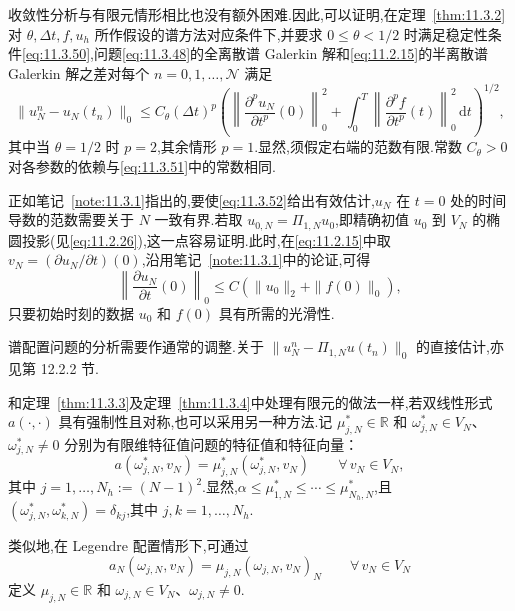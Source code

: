 收敛性分析与有限元情形相比也没有额外困难.因此,可以证明,在定理~\ref{thm:11.3.2}对 \(\theta,\Delta t,f,u_h\) 所作假设的谱方法对应条件下,并要求 \(0\le\theta<1/2\) 时满足稳定性条件\eqref{eq:11.3.50},问题\eqref{eq:11.3.48}的全离散谱 Galerkin 解和\eqref{eq:11.2.15}的半离散谱 Galerkin 解之差对每个 \(n=0,1,\ldots,\mathcal N\) 满足
\begin{equation}\label{eq:11.3.52}
  \|u_N^n-u_N(t_n)\|_0
    \le C_\theta(\Delta t)^p\left(
       \left\|\frac{\partial^p u_N}{\partial t^p}(0)\right\|_0^2
       +\int_0^T\left\|\frac{\partial^p f}{\partial t^p}(t)\right\|_0^2\,\mathrm dt
                              \right)^{1/2},
\end{equation}
其中当 \(\theta=1/2\) 时 \(p=2\),其余情形 \(p=1\).显然,须假定右端的范数有限.常数 \(C_\theta>0\) 对各参数的依赖与\eqref{eq:11.3.51}中的常数相同.

正如笔记~\ref{note:11.3.1}指出的,要使\eqref{eq:11.3.52}给出有效估计,\(u_N\) 在 \(t=0\) 处的时间导数的范数需要关于 \(N\) 一致有界.若取 \(u_{0,N}=\Pi_{1,N}u_0\),即精确初值 \(u_0\) 到 \(V_N\) 的椭圆投影(见\eqref{eq:11.2.26}),这一点容易证明.此时,在\eqref{eq:11.2.15}中取 \(v_N=(\partial u_N/\partial t)(0)\),沿用笔记~\ref{note:11.3.1}中的论证,可得
\[
  \left\|\frac{\partial u_N}{\partial t}(0)\right\|_0
        \le C(\|u_0\|_2+\|f(0)\|_0),
\]
只要初始时刻的数据 \(u_0\) 和 \(f(0)\) 具有所需的光滑性.

谱配置问题的分析需要作通常的调整.关于 \(\|u_N^n-\Pi_{1,N}u(t_n)\|_0\) 的直接估计,亦见第 12.2.2 节.

和定理~\ref{thm:11.3.3}及定理~\ref{thm:11.3.4}中处理有限元的做法一样,若双线性形式 \(a(\cdot,\cdot)\) 具有强制性且对称,也可以采用另一种方法.记 \(\mu_{j,N}^*\in\mathbb R\) 和 \(\omega_{j,N}^*\in V_N\)、\(\omega_{j,N}^*\ne0\) 分别为有限维特征值问题的特征值和特征向量：
\begin{equation}\label{eq:11.3.53}
  a(\omega_{j,N}^*,v_N)=\mu_{j,N}^*(\omega_{j,N}^*,v_N)\qquad\forall\,v_N\in V_N,
\end{equation}
其中 \(j=1,\ldots,N_h:=(N-1)^2\).显然,\(\alpha\le\mu_{1,N}^*\le\cdots\le\mu_{N_h,N}^*\),且 \((\omega_{j,N}^*,\omega_{k,N}^*)=\delta_{kj}\),其中 \(j,k=1,\ldots,N_h\).

类似地,在 Legendre 配置情形下,可通过
\begin{equation}\label{eq:11.3.54}
  a_N(\omega_{j,N},v_N)=\mu_{j,N}(\omega_{j,N},v_N)_N\qquad\forall\,v_N\in V_N
\end{equation}
定义 \(\mu_{j,N}\in\mathbb R\) 和 \(\omega_{j,N}\in V_N\)、\(\omega_{j,N}\ne0\).


